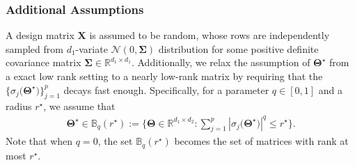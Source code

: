 \documentclass[alpha-refs]{wiley-article}
\begin{document}
\subsubsection{Additional Assumptions}
A design matrix $\boldsymbol{X}$ is assumed to be random, whose rows are independently sampled from $d_{1}$-variate $\mathcal{N}(0,\boldsymbol{\Sigma})$ distribution for some positive definite covariance matrix $\boldsymbol{\Sigma}\in\mathbb{R}^{d_{1} \times d_{1}}$.
Additionally, we relax the assumption of $\boldsymbol{\Theta}^{\star}$ from a exact low rank setting to a nearly low-rank matrix by requiring that the $\{\sigma_{j}\big(\boldsymbol{\Theta}^{\star}\big)\}_{j=1}^{p}$ decays fast enough.
Specifically, for a parameter $q\in[0,1]$ and a radius $r^{\star}$, we assume that
\begin{align*}
    \boldsymbol{\Theta}^{\star} \in \mathbb{B}_{q}(r^{\star})
    := \bigg\{ \boldsymbol{\Theta}\in\mathbb{R}^{d_{1} \times d_{2}} :
    \sum_{j=1}^{p} \left| \sigma_{j}\big(\boldsymbol{\Theta}^{\star} \big) \right|^{q} \leq r^{\star}
    \bigg\}.
\end{align*}
Note that when $q=0$, the set $\mathbb{B}_{q}(r^{\star})$ becomes the set of matrices with rank at most $r^{\star}$.
\end{document}
